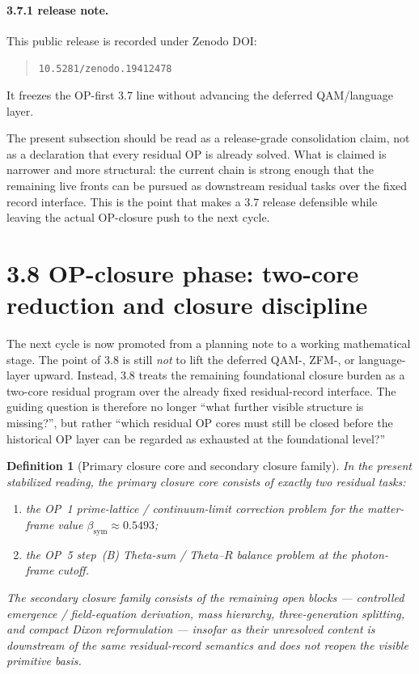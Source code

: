 \documentclass[12pt,a4paper]{article}
\newtheorem{definition}[theorem]{Definition}
\newcommand{\bsym}{\beta_{\mathrm{sym}}}
\begin{document}
\paragraph{3.7.1 release note.}
This public release is recorded under Zenodo DOI:
\begin{quote}
\texttt{10.5281/zenodo.19412478}
\end{quote}
It freezes the OP-first 3.7 line without advancing the deferred QAM/language layer.

The present subsection should be read as a release-grade consolidation claim, not as a declaration that every residual OP is already solved. What is claimed is narrower and more structural: the current chain is strong enough that the remaining live fronts can be pursued as downstream residual tasks over the fixed record interface. This is the point that makes a 3.7 release defensible while leaving the actual OP-closure push to the next cycle.

\section*{3.8 OP-closure phase: two-core reduction and closure discipline}
The next cycle is now promoted from a planning note to a working mathematical stage. The point of 3.8 is still \emph{not} to lift the deferred QAM-, ZFM-, or language-layer upward. Instead, 3.8 treats the remaining foundational closure burden as a two-core residual program over the already fixed residual-record interface. The guiding question is therefore no longer ``what further visible structure is missing?'', but rather ``which residual OP cores must still be closed before the historical OP layer can be regarded as exhausted at the foundational level?''

\begin{definition}[Primary closure core and secondary closure family]
\label{def:mainline-3800}
In the present stabilized reading, the \emph{primary closure core} consists of exactly two residual tasks:
\begin{enumerate}[label=(\roman*), leftmargin=2em]
 \item the OP~1 prime-lattice / continuum-limit correction problem for the matter-frame value $\bsym\approx 0.5493$;
 \item the OP~5 step~(B) Theta-sum / Theta--$R$ balance problem at the photon-frame cutoff.
\end{enumerate}
The \emph{secondary closure family} consists of the remaining open blocks --- controlled emergence / field-equation derivation, mass hierarchy, three-generation splitting, and compact Dixon reformulation --- insofar as their unresolved content is downstream of the same residual-record semantics and does not reopen the visible primitive basis.
\end{definition}
\end{document}
